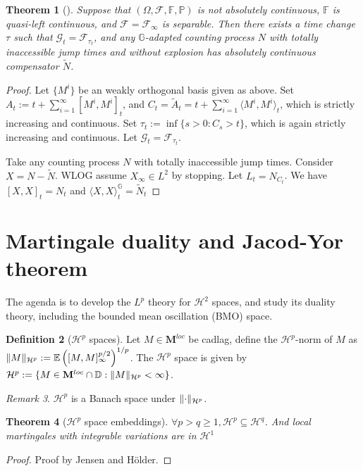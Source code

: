 \documentclass[openany,oneside]{book}
\newtheorem{thm}{Theorem}[section]
\theoremstyle{definition}
\newtheorem{defn}[thm]{Definition}
\theoremstyle{remark}
\newtheorem{rem}[thm]{Remark}
\newcommand{\E}{\mathbb{E}} %
\renewcommand{\P}{\mathbb{P}} %
\DeclarePairedDelimiter{\norm}{\lVert}{\rVert} %
\newcommand{\sH}[1][2]{\mathcal{H}^{#1}} %
\begin{document}
\begin{thm}[]
Suppose that $(\Omega, \mathcal{F}, \mathbb{F}, \P)$ is not absolutely continuous, $\mathbb{F}$ is quasi-left continuous, and $\mathcal{F}=\mathcal{F}_\infty$ is separable. Then there exists a time change $\tau$ such that $\mathcal{G}_t = \mathcal{F}_{\tau_t}$, and any $\mathbb{G}$-adapted counting process $N$ with totally inaccessible jump times and without explosion has absolutely continuous compensator $\tilde{N}$.
\end{thm}
\begin{proof}
Let $\{M^i\}$ be an weakly orthogonal basis given as above. Set $A_t := t+\sum_{i=1}^\infty [M^i, M^i]_t$, and $C_t = \tilde{A}_t = t+\sum_{i=1}^\infty \langle M^i, M^i\rangle_t$, which is strictly increasing and continuous. Set $\tau_t := \inf\{s>0 : C_s > t\}$, which is again strictly increasing and continuous. Let $\mathcal{G}_t = \mathcal{F}_{\tau_t}$.
\par
Take any counting process $N$ with totally inaccessible jump times. Consider $X=N-\tilde{N}$. WLOG assume $X_\infty \in L^2$ by stopping. Let $L_t = N_{C_t}$. We have $[X,X]_t = N_t$ and $\langle X,X\rangle^\mathbb{G}_t = \tilde{N}_t$
\end{proof}



\section{Martingale duality and Jacod-Yor theorem}
The agenda is to develop the $L^p$ theory for $\sH$ spaces, and study its duality theory, including the bounded mean oscillation (BMO) space.

\begin{defn}[$\mathcal{H}^p$ spaces]
Let $M\in \mathbf{M}^{loc}$ be cadlag, define the $\mathcal{H}^p$-norm of $M$ as $\norm{M}_{\mathcal{H}^p}:=\E\left([M,M]_\infty^{p/2}\right)^{1/p}$. The $\mathcal{H}^p$ space is given by $\mathcal{H}^p:= \{M\in\mathbf{M}^{loc} \cap \mathbb{D} : \norm{M}_{\mathcal{H}^p} < \infty \}$.
\end{defn}
\begin{rem}
$\mathcal{H}^p$ is a Banach space under $\norm{\cdot}_{\mathcal{H}^p}$.
\end{rem}

\begin{thm}[$\mathcal{H}^p$ space embeddings]
$\forall p>q \ge 1, \mathcal{H}^p \subseteq \mathcal{H}^q$. And local martingales with integrable variations are in $\mathcal{H}^1$
\end{thm}
\begin{proof}
Proof by Jensen and H\"older.
\end{proof}
\end{document}
